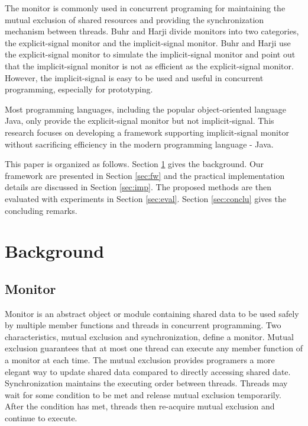 \documentclass[preprint]{sigplanconf}
\begin{document}
The monitor \cite{hoa74} is commonly used in concurrent programing for 
maintaining the mutual exclusion of shared resources and providing the 
synchronization mechanism between threads. Buhr and Harji \cite{bh05} divide 
monitors into two categories, the explicit-signal monitor and the 
implicit-signal monitor. Buhr and Harji use the explicit-signal monitor to 
simulate the implicit-signal monitor and point out that the implicit-signal 
monitor is not as efficient as the explicit-signal monitor. However, the 
implicit-signal is easy to be used and useful in concurrent programming,
especially for prototyping. 


Most programming languages, including the popular object-oriented language Java,
only provide the explicit-signal monitor but not implicit-signal. This research 
focuses on developing a framework supporting implicit-signal monitor without
sacrificing efficiency in the modern programming language - Java. 

This paper is organized as follows. Section \ref{sec:bg} gives the background. 
Our framework are presented in Section \ref{sec:fw} and the practical 
implementation details are discussed in Section \ref{sec:imp}. The proposed 
methods are then evaluated with experiments in Section \ref{sec:eval}. 
Section \ref{sec:conclu} gives the concluding remarks.

\section{Background} \label{sec:bg}


\subsection{Monitor}
Monitor is an abstract object or module containing shared data to be used safely
by multiple member functions and threads in concurrent programming. Two 
characteristics, mutual exclusion and synchronization, define a monitor. Mutual 
exclusion guarantees that at most one thread can execute any member function of 
a monitor at each time. The mutual exclusion provides programers a more elegant 
way to update shared data compared to directly accessing shared date. 
Synchronization maintains the executing order between threads. Threads may wait
for some condition to be met and release mutual exclusion temporarily. After the
condition has met, threads then re-acquire mutual exclusion and continue to 
execute.
\end{document}
